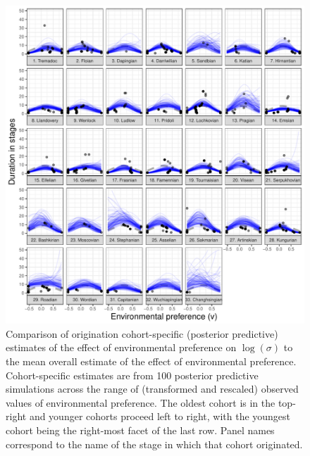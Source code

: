 \documentclass[11pt]{article}
\begin{document}
\begin{figure}[ht]
  \centering
  \includegraphics[width = \textwidth,height = 0.7\textheight,keepaspectratio=true]{figure/env_cohort_med_cweib_cens}
  \caption{Comparison of origination cohort-specific (posterior predictive) estimates of the effect of environmental preference on \(\log(\sigma)\) to the mean overall estimate of the effect of environmental preference. Cohort-specific estimates are from 100 posterior predictive simulations across the range of (transformed and rescaled) observed values of environmental preference. The oldest cohort is in the top-right and younger cohorts proceed left to right, with the youngest cohort being the right-most facet of the last row. Panel names correspond to the name of the stage in which that cohort originated.}
  \label{fig:env_cohort}
\end{figure}
\end{document}
